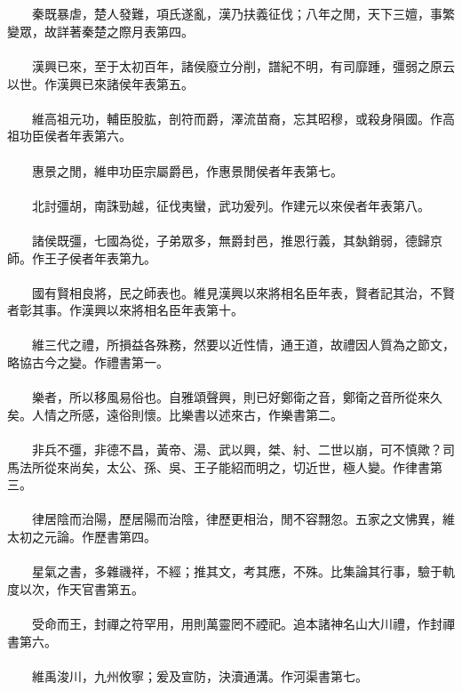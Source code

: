 \\\\
　　秦既暴虐，楚人發難，項氏遂亂，漢乃扶義征伐；八年之閒，天下三嬗，事繁變眾，故詳著秦楚之際月表第四。
\\\\
　　漢興已來，至于太初百年，諸侯廢立分削，譜紀不明，有司靡踵，彊弱之原云以世。作漢興已來諸侯年表第五。
\\\\
　　維高祖元功，輔臣股肱，剖符而爵，澤流苗裔，忘其昭穆，或殺身隕國。作高祖功臣侯者年表第六。
\\\\
　　惠景之閒，維申功臣宗屬爵邑，作惠景閒侯者年表第七。
\\\\
　　北討彊胡，南誅勁越，征伐夷蠻，武功爰列。作建元以來侯者年表第八。
\\\\
　　諸侯既彊，七國為從，子弟眾多，無爵封邑，推恩行義，其埶銷弱，德歸京師。作王子侯者年表第九。
\\\\
　　國有賢相良將，民之師表也。維見漢興以來將相名臣年表，賢者記其治，不賢者彰其事。作漢興以來將相名臣年表第十。
\\\\
　　維三代之禮，所損益各殊務，然要以近性情，通王道，故禮因人質為之節文，略協古今之變。作禮書第一。
\\\\
　　樂者，所以移風易俗也。自雅頌聲興，則已好鄭衛之音，鄭衛之音所從來久矣。人情之所感，遠俗則懷。比樂書以述來古，作樂書第二。
\\\\
　　非兵不彊，非德不昌，黃帝、湯、武以興，桀、紂、二世以崩，可不慎歟？司馬法所從來尚矣，太公、孫、吳、王子能紹而明之，切近世，極人變。作律書第三。
\\\\
　　律居陰而治陽，歷居陽而治陰，律歷更相治，閒不容翲忽。五家之文怫異，維太初之元論。作歷書第四。
\\\\
　　星氣之書，多雜禨祥，不經；推其文，考其應，不殊。比集論其行事，驗于軌度以次，作天官書第五。
\\\\
　　受命而王，封禪之符罕用，用則萬靈罔不禋祀。追本諸神名山大川禮，作封禪書第六。
\\\\
　　維禹浚川，九州攸寧；爰及宣防，決瀆通溝。作河渠書第七。
\\\\
